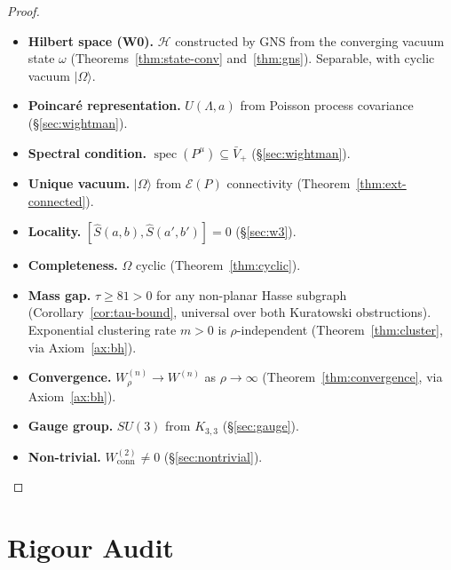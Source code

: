 \documentclass[11pt]{article}
\newcommand{\Kthree}{K_{3,3}}
\newcommand{\hilb}{\mathscr{H}}
\DeclareMathOperator{\spec}{spec}
\begin{document}
\begin{proof}
\leavevmode
\begin{itemize}
\item \textbf{Hilbert space (W0).}
  $\hilb$ constructed by GNS from the converging vacuum
  state $\omega$ (Theorems~\ref{thm:state-conv}
  and~\ref{thm:gns}).  Separable, with cyclic vacuum
  $|\Omega\rangle$.

\item \textbf{Poincar\'e representation.}
  $U(\Lambda, a)$ from Poisson process covariance
  (\S\ref{sec:wightman}).

\item \textbf{Spectral condition.}
  $\spec(P^\mu) \subseteq \bar{V}_+$ (\S\ref{sec:wightman}).

\item \textbf{Unique vacuum.}
  $|\Omega\rangle$ from $\mathcal{E}(P)$ connectivity
  (Theorem~\ref{thm:ext-connected}).

\item \textbf{Locality.}
  $[\hat{S}(a,b), \hat{S}(a',b')] = 0$ (\S\ref{sec:w3}).

\item \textbf{Completeness.}
  $\Omega$ cyclic (Theorem~\ref{thm:cyclic}).

\item \textbf{Mass gap.}
  $\tau \ge 81 > 0$ for any non-planar Hasse subgraph
  (Corollary~\ref{cor:tau-bound}, universal over both
  Kuratowski obstructions).  Exponential clustering rate
  $m > 0$ is $\rho$-independent (Theorem~\ref{thm:cluster},
  via Axiom~\ref{ax:bh}).

\item \textbf{Convergence.}
  $W^{(n)}_\rho \to W^{(n)}$ as $\rho \to \infty$
  (Theorem~\ref{thm:convergence}, via Axiom~\ref{ax:bh}).

\item \textbf{Gauge group.}
  $SU(3)$ from $\Kthree$ (\S\ref{sec:gauge}).

\item \textbf{Non-trivial.}
  $W^{(2)}_{\mathrm{conn}} \ne 0$ (\S\ref{sec:nontrivial}).
  \qedhere
\end{itemize}
\end{proof}

\section{Rigour Audit}
\label{sec:audit}
\end{document}
